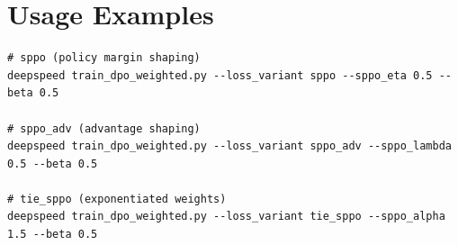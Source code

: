 \documentclass[11pt]{article}
\begin{document}
\section*{Usage Examples}
\begin{verbatim}
# sppo (policy margin shaping)
deepspeed train_dpo_weighted.py --loss_variant sppo --sppo_eta 0.5 --beta 0.5

# sppo_adv (advantage shaping)
deepspeed train_dpo_weighted.py --loss_variant sppo_adv --sppo_lambda 0.5 --beta 0.5

# tie_sppo (exponentiated weights)
deepspeed train_dpo_weighted.py --loss_variant tie_sppo --sppo_alpha 1.5 --beta 0.5
\end{verbatim}
\end{document}
